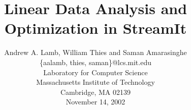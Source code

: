 \documentclass{sig-alternate}
\title{Linear Data Analysis and Optimization in StreamIt}
\author{
\alignauthor \vspace{-18pt}
Andrew A. Lamb,
William Thies
and Saman Amarasinghe\\
	\vspace{8pt}
	\{aalamb, thies, saman\}@lcs.mit.edu \\
	\vspace{8pt}
	Laboratory for Computer Science \\
	Massachusetts Institute of Technology \\
	Cambridge, MA  02139 \\
	\vspace{8pt}
        November 14, 2002}
\begin{document}
\newtheorem{definition}{Definition}
\newtheorem{transformation}{Transformation}

\maketitle

\newcommand{\mt}[1]{\mbox{\it #1}}

\begin{abstract}

\end{abstract}












\clearpage

\appendix

\end{document}

